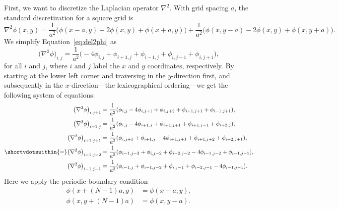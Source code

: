 First, we want to discretize the Laplacian operator \(\nabla^2\).
With grid spacing \(a\), the standard discretization for a square grid is
%
\begin{equation}\label{eq:del2phi}
    \nabla^2 \phi(x, y) =
    \frac{ 1 }{ a^2 } \bigl(\phi(x - a, y) - 2 \phi(x, y) + \phi(x + a, y)\bigr) +
    \frac{ 1 }{ a^2 } \bigl(\phi(x, y - a) - 2 \phi(x, y) + \phi(x, y + a)\bigr).
\end{equation}
%
We simplify Equation~\eqref{eq:del2phi} as
%
\begin{equation}\label{eq:del2phisim}
    \bigl(\nabla^2 \phi\bigr)_{i, j} = \frac{1}{a^2} \bigl(
    -4 \phi_{i, j} + \phi_{i+1, j} + \phi_{i-1, j} + \phi_{i, j-1} + \phi_{i, j+1}
    \bigr),
\end{equation}
%
for all \(i\) and \(j\),
where \(i\) and \(j\) label the \(x\) and \(y\) coordinates, respectively.
By starting at the lower left corner and traversing in the \(y\)-direction first, and
subsequently in the \(x\)-direction---the lexicographical ordering---we get the following
system of equations:
%
\begin{align}
    \bigl(\nabla^2 \phi\bigr)_{i, j+1}   & = \frac{1}{a^2} (
    \phi_{i, j} - 4\phi_{i, j+1} + \phi_{i, j+2} + \phi_{i+1, j+1} + \phi_{i-1, j+1}
    ),                                                       \\
    \bigl(\nabla^2 \phi\bigr)_{i+1, j}   & = \frac{1}{a^2} (
    \phi_{i, j} - 4\phi_{i+1, j} + \phi_{i+1, j+1} + \phi_{i+1, j-1} + \phi_{i+2, j}
    ),                                                       \\
    \bigl(\nabla^2 \phi\bigr)_{i+1, j+1} & = \frac{1}{a^2} (
    \phi_{i, j+1} + \phi_{i+1, j} - 4\phi_{i+1, j+1} + \phi_{i+1, j+2} + \phi_{i+2, j+1}
    ),                                                       \\
    \shortvdotswithin{=} %
    \bigl(\nabla^2 \phi\bigr)_{i-1, j-2} & = \frac{1}{a^2} (
    \phi_{i-1, j-3} + \phi_{i, j-2} + \phi_{i-2, j-2} - 4\phi_{i-1, j-2} + \phi_{i-1, j-1}
    ),                                                       \\
    \bigl(\nabla^2 \phi\bigr)_{i-1, j-1} & = \frac{1}{a^2} (
    \phi_{i-1, j} + \phi_{i-1, j-2} + \phi_{i, j-1} + \phi_{i-2, j-1} - 4\phi_{i-1, j-1}
    ).\label{eq:delend}
\end{align}
%
Here we apply the periodic boundary condition
%
\begin{align}
    \phi(x + (N-1)a, y) & = \phi(x - a, y), \\
    \phi(x, y + (N-1)a) & = \phi(x, y - a).
\end{align}

